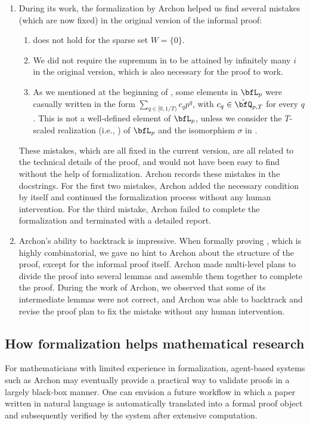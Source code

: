\documentclass[english,oneside]{smfart}
\begin{document}
\begin{enumerate}
    \item During its work, the formalization by Archon helped us find several mistakes (which are now fixed) in the original version of the informal proof:
    \begin{enumerate}
        \item {} does not hold for the sparse set $W=\{0\}$.
        \item We did not require the supremum in  to be attained by infinitely many $i$ in the original version, which is also necessary for the proof to work.
        \item As we mentioned at the beginning of , some elements in $\bfL_p$ were casually written in the form $\sum_{q\in [0,1/T)}c_q p^q$, with $c_q\in\breve{\bfQ}_{p,T}$ for every $q$. This is not a well-defined element of $\bfL_p$, unless we consider the $T$-scaled realization (i.e., ) of $\bfL_p$ and the isomorphism $\sigma$ in .
    \end{enumerate}
    These mistakes, which are all fixed in the current version, are all related to the technical details of the proof, and would not have been easy to find without the help of formalization. Archon records these mistakes in the docstrings. For the first two mistakes, Archon added the necessary condition by itself and continued the formalization process without any human intervention. For the third mistake, Archon failed to complete the formalization and terminated with a detailed report.
    \item Archon's ability to backtrack is impressive. When formally proving , which is highly combinatorial, we gave no hint to Archon about the structure of the proof, except for the informal proof itself. Archon made multi-level plans to divide the proof into several lemmas and assemble them together to complete the proof. During the work of Archon, we observed that some of its intermediate lemmas were not correct, and Archon was able to backtrack and revise the proof plan to fix the mistake without any human intervention.
\end{enumerate}

\subsection{How formalization helps mathematical research}
For mathematicians with limited experience in formalization, agent-based systems such as Archon may eventually provide a practical way to validate proofs in a largely black-box manner. One can envision a future workflow in which a paper written in natural language is automatically translated into a formal proof object and subsequently verified by the system after extensive computation.
\end{document}
